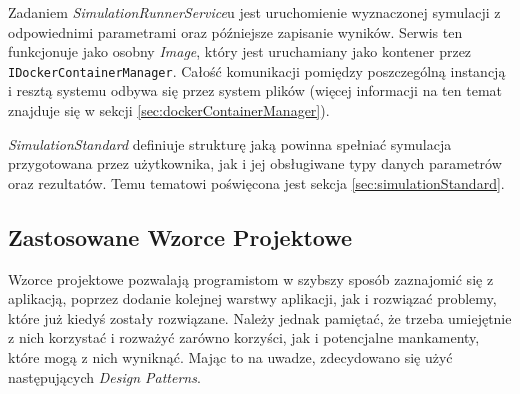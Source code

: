 \par Zadaniem \emph{SimulationRunnerService}u jest uruchomienie wyznaczonej symulacji z odpowiednimi parametrami oraz późniejsze zapisanie wyników. Serwis ten funkcjonuje jako osobny \emph{\docker Image}, który jest uruchamiany jako kontener przez \texttt{IDockerContainerManager}. Całość komunikacji pomiędzy poszczególną instancją i resztą systemu odbywa się przez system plików (więcej informacji na ten temat znajduje się w sekcji \ref{sec:dockerContainerManager}).

\par \emph{SimulationStandard} definiuje strukturę jaką powinna spełniać symulacja przygotowana przez użytkownika, jak i jej obsługiwane typy danych parametrów oraz rezultatów. Temu tematowi poświęcona jest sekcja \ref{sec:simulationStandard}.

\subsection{Zastosowane Wzorce Projektowe}

\par Wzorce projektowe pozwalają programistom w szybszy sposób zaznajomić się z aplikacją, poprzez dodanie kolejnej warstwy aplikacji, jak i rozwiązać problemy, które już kiedyś zostały rozwiązane. Należy jednak pamiętać, że trzeba umiejętnie z nich korzystać i rozważyć zarówno korzyści, jak i potencjalne mankamenty, które mogą z nich wyniknąć. Mając to na uwadze, zdecydowano się użyć następujących \emph{Design Patterns}.

